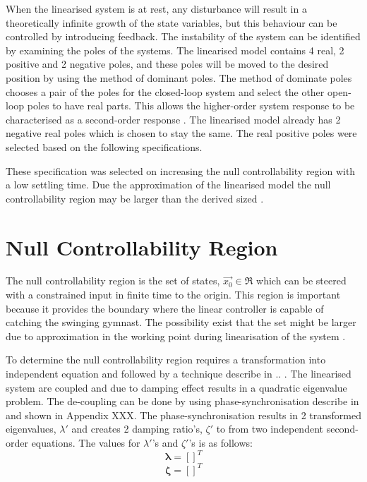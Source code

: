 \documentclass[a4paper,12pt]{article}
\begin{document}
	When the linearised system is at rest, any disturbance will result in a theoretically infinite growth of the state variables, but this behaviour can be controlled by introducing feedback. The instability of the system can be identified by examining the poles of the systems. The linearised model contains 4 real, 2 positive and 2 negative poles, and these poles will be moved to the desired position by using the method of dominant poles. The method of dominate poles chooses a pair of the poles for the closed-loop system and select the other open-loop poles to have real parts. This allows the higher-order system response to be characterised as a second-order response \cite{textbook}. The linearised model already has 2 negative real poles which is chosen to stay the same. The real positive poles were selected based on the following specifications.
	
	These specification was selected on increasing the null controllability region with a low settling time. Due the approximation of the linearised model the null controllability region may be larger than the derived sized \cite{simple_null_controllability}. 
	
	
	\section{Null Controllability Region}
	
	The null controllability region is the set of states, $\vec{x_{0}} \in \Re $ which can be steered with a constrained input in finite time to the origin. This region is important because it provides the boundary where the linear controller is capable of catching the swinging gymnast. The possibility exist that the set might be larger due to approximation in the working point during linearisation of the system \cite{simple_null_controllability}. 
	
	To determine the null controllability region requires a transformation into independent equation and followed by a technique describe in .. . The linearised system are coupled and due to damping effect results in a quadratic eigenvalue problem. The de-coupling can be done by using phase-synchronisation describe in \cite{independent_eqaution} and shown in Appendix XXX. The phase-synchronisation results in 2 transformed eigenvalues, $\lambda'$ and creates 2 damping ratio's, $\zeta'$ to from two independent second-order equations. The values for $\lambda'$'s and $\zeta'$'s is as follows: $$ \boldsymbol{\lambda} = [ ]^{T} $$ $$ \boldsymbol{\zeta} = []^{T} $$
	
\end{document}
